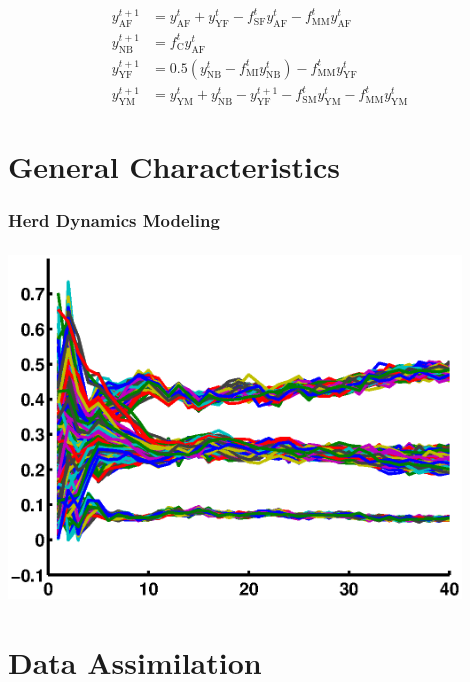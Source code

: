 \documentclass[mathserif]{beamer}
\begin{document}
\begin{frame}
\begin{center}
\frametitle{\insertsection}
\begin{align}
  y_{\text{AF}}^{t+1} &= y_{\text{AF}}^t + y_{\text{YF}}^t - f_{\text{SF}}^ty_{\text{AF}}^t - f_{\text{MM}}^ty_{\text{AF}}^t \\
  y_{\text{NB}}^{t+1} &= f_{\text{C}}^ty_{\text{AF}}^t \\
  y_{\text{YF}}^{t+1} &= 0.5(y_{\text{NB}}^t - f_{\text{MI}}^ty_{\text{NB}}^t) - f_{\text{MM}}^ty_{\text{YF}}^t \\
  y_{\text{YM}}^{t+1} &= y_{\text{YM}}^t + y_{\text{NB}}^t - y_{\text{YF}}^{t+1} - f_{\text{SM}}^ty_{\text{YM}}^t - f_{\text{MM}}^ty_{\text{YM}}^t
\end{align}
\end{center}
\end{frame}

\section{General Characteristics}

\begin{frame}
\frametitle{Herd Dynamics Modeling}
\tableofcontents[currentsection]
\end{frame}


\begin{frame}
\begin{center}
\frametitle{\insertsection}
\includegraphics[width=0.9\textwidth]{ratios}
\end{center}
\end{frame}

\section{Data Assimilation}
\end{document}
